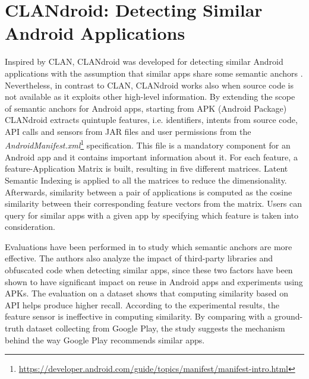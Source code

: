 
\section{CLANdroid: Detecting Similar Android Applications}\label{sec:clandroid}

Inspired by CLAN, CLANdroid was developed for detecting similar Android applications with the assumption that similar apps share some semantic anchors \cite{10.1109ICPC.2016.7503721}. Nevertheless, in contrast to CLAN, CLANdroid works also when source code is not available as it exploits other high-level information. By extending the scope of semantic anchors for Android apps, starting from APK (Android Package) CLANdroid extracts quintuple features, i.e. identifiers, intents from source code, API calls and sensors from JAR files and user permissions from the \textit{AndroidManifest.xml}\footnote{\url{https://developer.android.com/guide/topics/manifest/manifest-intro.html}} specification. This file is a mandatory component for an Android app and it contains important information about it. For each feature, a feature-Application Matrix is built, resulting in five different matrices. Latent Semantic Indexing is applied to all the matrices to reduce the dimensionality. Afterwards, similarity between a pair of applications is computed as the cosine similarity between their corresponding feature vectors from the matrix. Users can query for similar apps with a given app by specifying which feature is taken into consideration. 

Evaluations have been performed in \cite{10.1109ICPC.2016.7503721} to study which semantic anchors are more effective. The authors also analyze the impact of third-party libraries and obfuscated code when detecting similar apps, since these two factors have been shown to have significant impact on reuse in Android apps and experiments using APKs. The evaluation on a dataset shows that computing similarity based on API helps produce higher recall. According to the experimental results, the feature sensor is ineffective in computing similarity. By comparing with a ground-truth dataset collecting from Google Play, the study suggests the mechanism behind the way Google Play recommends similar apps. %


